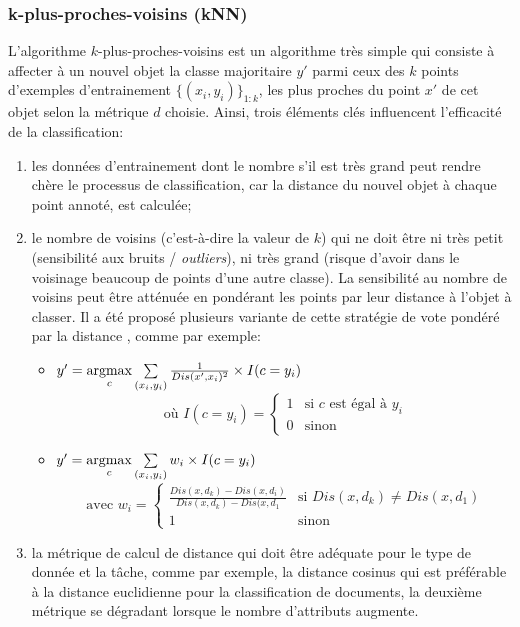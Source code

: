\subsubsection{k-plus-proches-voisins (kNN)}
L'algorithme $k$-plus-proches-voisins est un algorithme très simple qui consiste à affecter à un nouvel objet la classe majoritaire $y'$ parmi ceux des $k$ points d'exemples d'entrainement $\lbrace (x_i,y_i) \rbrace_{1:k}$, les plus proches du point $x'$ de cet objet selon la métrique $d$ choisie. Ainsi, trois éléments clés influencent l'efficacité de la classification:
\begin{enumerate}
	\item les données d'entrainement dont le nombre s'il est très grand peut rendre chère le processus de classification, car la distance du nouvel objet à chaque point annoté, est calculée;
	\item le nombre de voisins (c'est-à-dire la valeur de $k$) qui ne doit être ni très petit (sensibilité aux bruits / \textit{outliers}), ni très grand (risque d'avoir dans le voisinage beaucoup de points d'une autre classe). La sensibilité au nombre de voisins peut être atténuée en pondérant les points par leur distance à l'objet à classer. Il a été proposé plusieurs variante de cette stratégie de \og vote pondéré par la distance \fg{}, comme par exemple:
	\begin{itemize}
		\item $y' = \mathop{\mathrm{argmax}}\limits\limits_c \sum\limits_{(x_i,y_i)} \frac{1}{Dis(x', x_i)^2} \times I(c = y_i)$  \citep{dudani1976originalwknn} \[\text{ où } I(c=y_i) = \left\lbrace \begin{array}{ll}
		1 & \text{si }c \text{ est égal à } y_i \\
		0 & \text{sinon}
		\end{array} \right.\]
		\item $y' = \mathop{\mathrm{argmax}}\limits\limits_c \sum\limits_{(x_i,y_i)} w_i \times I(c = y_i)$ \citep{gou2011wknn} \[\text{ avec } w_i = \left\lbrace \begin{array}{ll}
		\frac{Dis(x, d_k) - Dis(x, d_i)}{Dis(x, d_k) - Dis(x, d_1} & \text{si } Dis(x, d_k) \neq Dis(x, d_1) \\
		1 & \text{sinon}
		\end{array} \right.\]
	\end{itemize}
	 
	\item la métrique de calcul de distance qui doit être adéquate pour le type de donnée et la tâche, comme par exemple, la distance cosinus qui est préférable à la distance euclidienne pour la classification de documents, la deuxième métrique se dégradant lorsque le nombre d'attributs augmente.
\end{enumerate}

